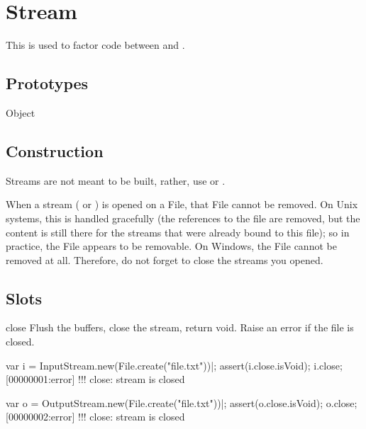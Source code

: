 
\section{Stream}

This is used to factor code between  and
.

\subsection{Prototypes}
\begin{refObjects}
\item[Object]
\end{refObjects}

\subsection{Construction}
\label{sec:specs:Stream:ctor}

Streams are not meant to be built, rather, use  or
.

When a stream ( or ) is
opened on a File, that File cannot be removed.  On Unix systems, this is
handled gracefully (the references to the file are removed, but the content
is still there for the streams that were already bound to this file); so in
practice, the File appears to be removable.  On Windows, the File cannot be
removed at all.  Therefore, do not forget to close the streams you opened.

\subsection{Slots}

\begin{urbiscriptapi}
\item[close] Flush the buffers, close the stream, return void.  Raise an
  error if the file is closed.
\begin{urbiscript}
var i = InputStream.new(File.create("file.txt"))|;
assert(i.close.isVoid);
i.close;
[00000001:error] !!! close: stream is closed

var o = OutputStream.new(File.create("file.txt"))|;
assert(o.close.isVoid);
o.close;
[00000002:error] !!! close: stream is closed
\end{urbiscript}
\end{urbiscriptapi}

